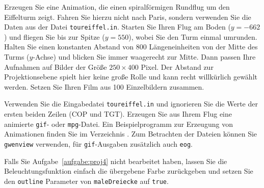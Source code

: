 %
Erzeugen Sie eine Animation, die einen spiralförmigen Rundflug um den 
Eiffelturm zeigt. Fahren Sie hierzu nicht nach Paris, sondern verwenden 
Sie die Daten aus der Datei \texttt{toureiffel.in}. Starten Sie Ihren 
Flug am Boden ($y = -662$) und fliegen Sie bis zur Spitze ($y=550$), 
wobei Sie den Turm einmal umrunden. Halten Sie einen konstanten Abstand 
von 800 Längeneinheiten von der Mitte des Turms ($y$-Achse) und blicken 
Sie immer waagerecht zur Mitte. Dann passen Ihre Aufnahmen auf Bilder 
der Größe $250 × 400$ Pixel. Der Abstand zur Projektionsebene spielt 
hier keine große Rolle und kann recht willkürlich gewählt werden. Setzen 
Sie Ihren Film aus 100 Einzelbildern zusammen.

Verwenden Sie die Eingabedatei \texttt{toureiffel.in} und ignorieren Sie 
die Werte der ersten beiden Zeilen (COP und TGT). Erzeugen Sie aus Ihrem 
Flug eine animierte \texttt{gif}- oder \texttt{mpg}-Datei. Ein 
Beispielprogramm zur Erzeugung von Animationen finden Sie im Verzeichnis
. 
Zum Betrachten der Dateien können Sie \texttt{gwenview} verwenden, für 
\texttt{gif}-Ausgaben zusätzlich auch \texttt{eog}.

Falls Sie Aufgabe~\ref{aufgabe:proj4} nicht bearbeitet haben, lassen Sie 
die Beleuchtungsfunktion einfach die übergebene Farbe zurückgeben und 
setzen Sie den \texttt{outline} Parameter von \texttt{maleDreiecke} auf 
\texttt{true}.
